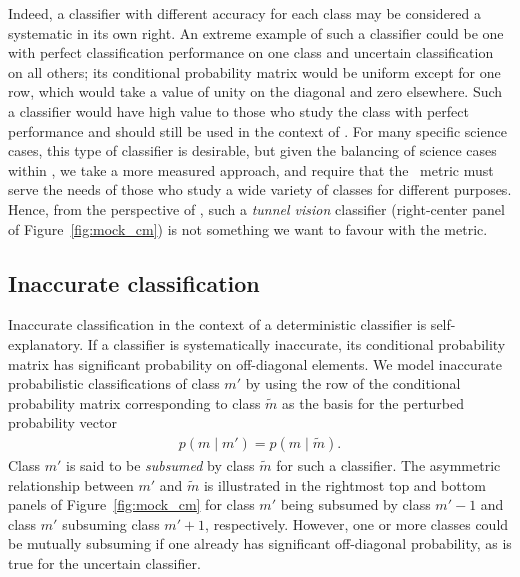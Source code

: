 Indeed, a classifier with different accuracy for each class may be considered a systematic in its own right.
An extreme example of such a classifier could be one with perfect classification performance on one class and uncertain classification on all others; its conditional probability matrix would be uniform except for one row, which would take a value of unity on the diagonal and zero elsewhere.
Such a classifier would have high value to those who study the class with perfect performance and should still be used in the context of \lsst.
For many specific science cases, this type of classifier is desirable, but given the balancing of science cases within \lsst, we take a more measured approach, and require that the \plasticc\ metric must serve the needs of those who study a wide variety of classes for different purposes.
Hence, from the perspective of \plasticc, such a \textit{tunnel vision} classifier (right-center panel of Figure~\ref{fig:mock_cm}) is not something we want to favour with the metric.

\subsection{Inaccurate classification}
\label{sec:inaccuratedata}

Inaccurate classification in the context of a deterministic classifier is self-explanatory.
If a classifier is systematically inaccurate, its conditional probability matrix has significant probability on off-diagonal elements.
We model inaccurate probabilistic classifications of class $m'$ by using the row of the conditional probability matrix corresponding to class $\tilde{m}$ as the basis for the perturbed probability vector
\begin{eqnarray}
  \label{eq:subsume}
  p(m \mid m') = p(m \mid \tilde{m}).
\end{eqnarray}
Class $m'$ is said to be \textit{subsumed} by class $\tilde{m}$ for such a classifier.
The asymmetric relationship between $m'$ and $\tilde{m}$ is illustrated in the rightmost top and bottom panels of Figure~\ref{fig:mock_cm} for class $m'$ being subsumed by class $m'-1$ and class $m'$ subsuming class $m'+1$, respectively.
However, one or more classes could be mutually subsuming if one already has significant off-diagonal probability, as is true for the uncertain classifier.

